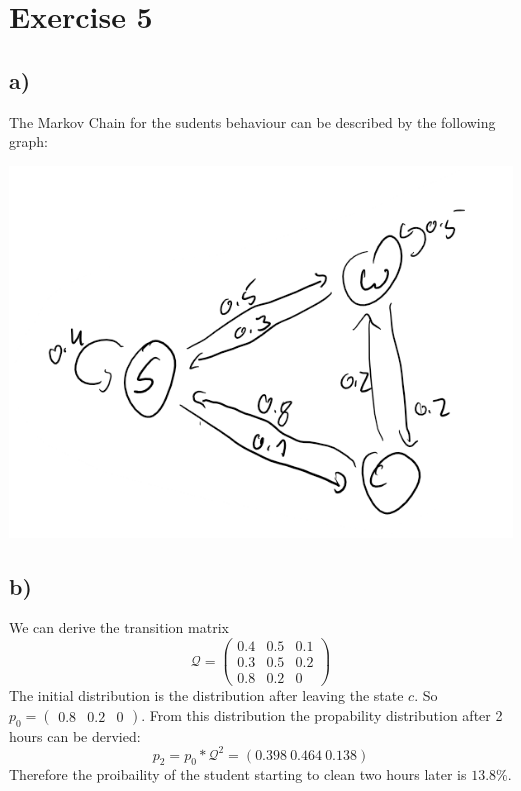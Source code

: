 \section*{Exercise 5}
\subsection*{a)}
The Markov Chain for the sudents behaviour can be described by the following graph:
\begin{center}
  \includegraphics[scale = 0.75]{EX5Graph.png}
\end{center}
\subsection*{b)}
We can derive the transition matrix \[\mathcal{Q} = \left(\begin{matrix}
0.4&0.5&0.1\\0.3&0.5&0.2\\0.8&0.2&0
\end{matrix}\right)\]
The initial distribution is the distribution after leaving the state $c$. So $p_0 = \left(\begin{matrix}
0.8&0.2&0
\end{matrix}\right)$.
From this distribution the propability distribution after 2 hours can be dervied:
\[p_2 = p_0 * \mathcal{Q}^2 = \left(0.398\:0.464\:0.138\right)\]
Therefore the proibaility of the student starting to clean two hours later is $13.8\%$.

